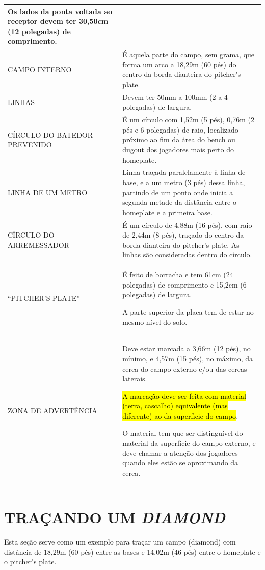 {\begin{longtable}{|p{30mm}|p{140mm}|}
		Os lados da ponta voltada ao receptor devem ter 30,50cm (12 polegadas) de comprimento. \\\hline
		CAMPO INTERNO &	É aquela parte do campo, sem grama, que forma um arco a 18,29m (60 pés) do centro da borda dianteira do \gls{pitcher's plate}.	\\\hline
		LINHAS &  Devem ter 50mm a 100mm (2 a 4 polegadas) de largura.\\\hline
		CÍRCULO DO BATEDOR PREVENIDO &
		É um círculo com 1,52m (5 pés), 0,76m (2 pés e 6 polegadas) de raio, localizado próximo ao fim da área do \gls{bench} ou \gls{dugout} dos jogadores mais perto do \gls{homeplate}.
		\\\hline
		LINHA DE UM METRO &
		Linha traçada paralelamente à linha de base, e a um metro (3 pés) dessa linha, partindo de um ponto onde inicia a segunda metade da distância entre o \gls{homeplate} e a primeira base. \\\hline
		CÍRCULO DO ARREMESSADOR &
		É um círculo de 4,88m (16 pés), com raio de 2,44m (8 pés), traçado do centro da borda dianteira do \gls{pitcher's plate}. As linhas são consideradas dentro do círculo. \\\hline
		“PITCHER’S PLATE” &
		 É feito de borracha e tem 61cm (24 polegadas) de comprimento e 15,2cm (6 polegadas) de largura.

		 A parte superior da placa tem de estar no mesmo nível do solo.
		 \\\hline
		ZONA DE ADVERTÊNCIA &
		 Deve estar marcada a 3,66m (12 pés), no mínimo, e 4,57m (15 pés), no máximo, da cerca do campo externo e/ou das cercas laterais.

		\hl{ A marca\c{c}\~ao deve ser feita com material (terra, cascalho) equivalente (mas diferente) ao da superf\'{\i}cie do campo}.

		O material tem que ser distinguível do material da superfície do campo externo, e deve chamar a atenção dos jogadores quando eles estão se aproximando da cerca.
		\\\hline

	\end{longtable}
}


\section{TRAÇANDO UM \textit{DIAMOND}}

Esta seção serve como um exemplo para traçar um campo (\gls{diamond}) com distância de 18,29m (60 pés) entre as bases e 14,02m (46 pés) entre o \gls{homeplate} e o \gls{pitcher's plate}.

